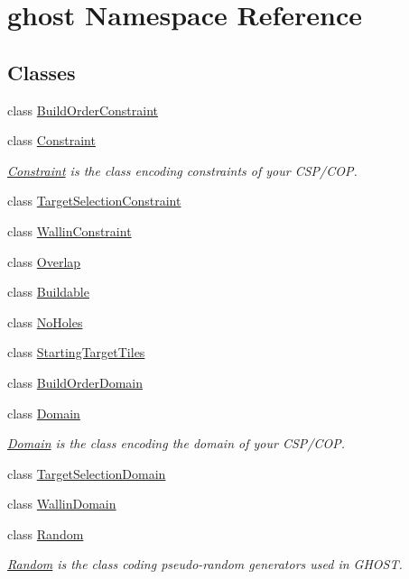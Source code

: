\hypertarget{namespaceghost}{\section{ghost Namespace Reference}
\label{namespaceghost}
}
\subsection*{Classes}
\begin{DoxyCompactItemize}
\item 
class \hyperlink{classghost_1_1BuildOrderConstraint}{Build\-Order\-Constraint}
\item 
class \hyperlink{classghost_1_1Constraint}{Constraint}
\begin{DoxyCompactList}\small\item\em \hyperlink{classghost_1_1Constraint}{Constraint} is the class encoding constraints of your C\-S\-P/\-C\-O\-P. \end{DoxyCompactList}\item 
class \hyperlink{classghost_1_1TargetSelectionConstraint}{Target\-Selection\-Constraint}
\item 
class \hyperlink{classghost_1_1WallinConstraint}{Wallin\-Constraint}
\item 
class \hyperlink{classghost_1_1Overlap}{Overlap}
\item 
class \hyperlink{classghost_1_1Buildable}{Buildable}
\item 
class \hyperlink{classghost_1_1NoHoles}{No\-Holes}
\item 
class \hyperlink{classghost_1_1StartingTargetTiles}{Starting\-Target\-Tiles}
\item 
class \hyperlink{classghost_1_1BuildOrderDomain}{Build\-Order\-Domain}
\item 
class \hyperlink{classghost_1_1Domain}{Domain}
\begin{DoxyCompactList}\small\item\em \hyperlink{classghost_1_1Domain}{Domain} is the class encoding the domain of your C\-S\-P/\-C\-O\-P. \end{DoxyCompactList}\item 
class \hyperlink{classghost_1_1TargetSelectionDomain}{Target\-Selection\-Domain}
\item 
class \hyperlink{classghost_1_1WallinDomain}{Wallin\-Domain}
\item 
class \hyperlink{classghost_1_1Random}{Random}
\begin{DoxyCompactList}\small\item\em \hyperlink{classghost_1_1Random}{Random} is the class coding pseudo-\/random generators used in G\-H\-O\-S\-T. \end{DoxyCompactList}\item 

\end{DoxyCompactItemize}
